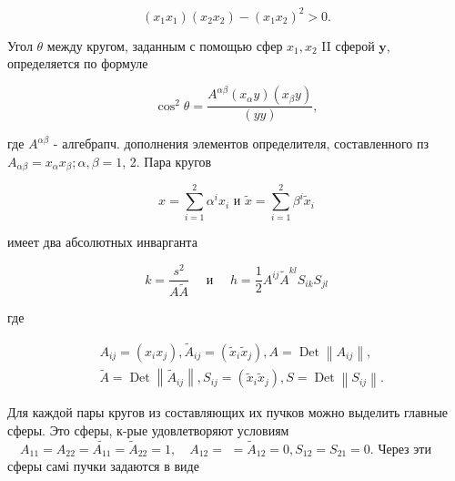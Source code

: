 \documentclass[10pt]{article}
\begin{document}
\[

\left(x_{1} x_{1}\right)\left(x_{2} x_{2}\right)-\left(x_{1} x_{2}\right)^{2}>0 .

\]



Угол $\theta$ между кругом, заданным с помощью сфер $x_{1}, x_{2}$ II сферой $\boldsymbol{y}$, определяется по формуле



\[

\cos ^{2} \theta=\frac{A^{\alpha \beta}\left(x_{\alpha} y\right)\left(x_{\beta} y\right)}{(y y)},

\]



где $A^{\alpha \beta}$ - алгебрапч. дополнения элементов определителя, составленного пз $A_{\alpha \beta}=x_{\alpha} x_{\beta} ; \alpha, \beta=1$, 2. Пара кругов



\[

x=\sum_{i=1}^{2} \alpha^{i} x_{i} \text { и } \tilde{x}=\sum_{i=1}^{2} \beta^{i} \tilde{x}_{i}

\]



имеет два абсолютных инварганта



\[

k=\frac{s^{2}}{A \tilde{A}} \quad \text { и } \quad h=\frac{1}{2} A^{i j} \tilde{A}^{k l} S_{i k} S_{j l}

\]



где



\[

\begin{aligned}

& A_{i j}=\left(x_{i} x_{j}\right), \tilde{A}_{i j}=\left(\tilde{x}_{i} \tilde{x}_{j}\right), A=\operatorname{Det}\left\|A_{i j}\right\|, \\

& \tilde{A}=\operatorname{Det}\left\|\tilde{A}_{i j}\right\|, S_{i j}=\left(\tilde{x}_{i} \tilde{x}_{j}\right), S=\operatorname{Det}\left\|S_{i j}\right\| .

\end{aligned}

\]



Для каждой пары кругов из составляющих их пучков можно выделить главные сферы. Это сферы, к-рые удовлетворяют условиям $\quad A_{11}=A_{22}=\tilde{A_{11}}=\tilde{A}_{22}=1, \quad A_{12}=$ $=\tilde{A}_{12}=0, S_{12}=S_{21}=0$. Через эти сферы самі пучки задаются в виде
\end{document}
